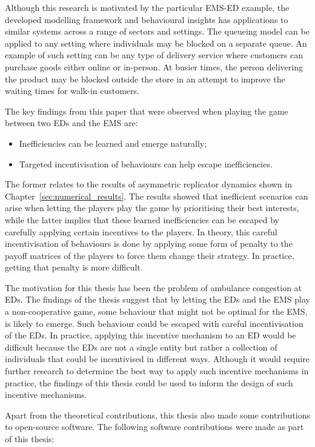 Although this research is motivated by the particular EMS-ED example, the
developed modelling framework and behavioural insights has applications to
similar systems across a range of sectors and settings.
The queueing model can be applied to any setting where individuals may be
blocked on a separate queue.
An example of such setting can be any type of delivery service where customers
can purchase goods either online or in-person.
At busier times, the person delivering the product may be blocked outside the
store in an attempt to improve the waiting times for walk-in customers.


The key findings from this paper that were observed when playing the game
between two EDs and the EMS are:

\begin{itemize}
    \item Inefficiencies can be learned and emerge naturally;
    \item Targeted incentivisation of behaviours can help escape inefficiencies.
\end{itemize}

The former relates to the results of asymmetric replicator dynamics shown
in Chapter~\ref{sec:numerical_results}.
The results showed that inefficient scenarios can arise when letting the players
play the game by prioritising their best interests, while the latter
implies that these learned inefficiencies can be escaped by carefully applying
certain incentives to the players.
In theory, this careful incentivisation of behaviours is done by applying some
form of penalty to the payoff matrices of the players to force them change
their strategy.
In practice, getting that penalty is more difficult.

The motivation for this thesis has been the problem of ambulance congestion
at EDs. 
The findings of the thesis suggest that by letting the EDs and the EMS play a
non-cooperative game, some behaviour that might not be optimal for the EMS, is
likely to emerge.
Such behaviour could be escaped with careful incentivisation of the EDs.
In practice, applying this incentive mechanism to an ED would be difficult
because the EDs are not a single entity but rather a collection of individuals
that could be incentivised in different ways.
Although it would require further research to determine the best way to
apply such incentive mechanisms in practice, the findings of this thesis
could be used to inform the design of such incentive mechanisms.

Apart from the theoretical contributions, this thesis also made some
contributions to open-source software.
The following software contributions were made as part of this thesis:

